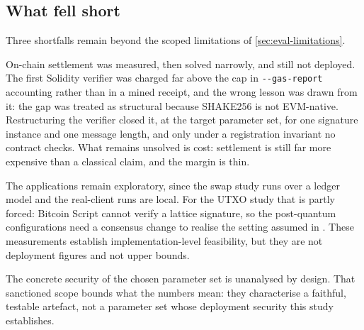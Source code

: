 \subsection{What fell short}
\label{sec:reflection-shortfalls}

Three shortfalls remain beyond the scoped limitations of \cref{sec:eval-limitations}.

On-chain settlement was measured, then solved narrowly, and still not deployed. The first
Solidity verifier was charged far above the cap in \texttt{-{}-gas-report} accounting rather
than in a mined receipt, and the wrong lesson was drawn from it: the gap was treated as
structural because SHAKE256 is not EVM-native. Restructuring the verifier closed it, at the
target parameter set, for one signature instance and one message length, and only under a
registration invariant no contract checks. What remains unsolved is cost: settlement is
still far more expensive than a classical claim, and the margin is thin.

The applications remain exploratory, since the swap study runs over a ledger model and the
real-client runs are local. For the UTXO study that is partly forced: Bitcoin Script cannot
verify a lattice signature, so the post-quantum configurations need a consensus change to
realise the setting assumed in \cite{esgin2020post}. These measurements establish
implementation-level feasibility, but they are not deployment figures and not upper bounds.

The concrete security of the chosen parameter set is unanalysed by design. That sanctioned
scope bounds what the numbers mean: they characterise a faithful, testable artefact, not a
parameter set whose deployment security this study establishes.

